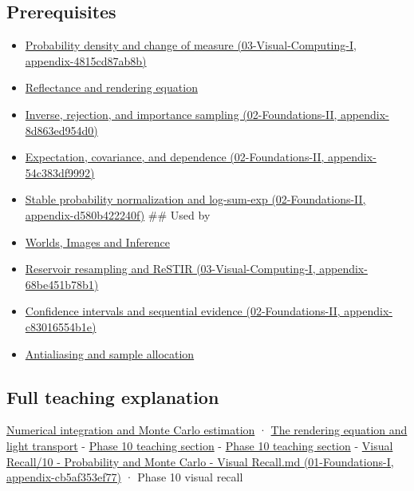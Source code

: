 \subsection{Prerequisites}\label{prerequisites}

\begin{itemize}
\item
  \href{}{Probability density and change of measure (03-Visual-Computing-I, appendix-4815cd87ab8b)}
\item
  \hyperref[appendix-96da0b153b77]{Reflectance and rendering equation}
\item
  \href{}{Inverse, rejection, and importance sampling (02-Foundations-II, appendix-8d863ed954d0)}
\item
  \href{}{Expectation, covariance, and dependence (02-Foundations-II, appendix-54c383df9992)}
\item
  \href{}{Stable probability normalization and log-sum-exp (02-Foundations-II, appendix-d580b422240f)} \#\# Used by
\item
  \href{Continuous\%20Notes/University\%20-\%20Worlds,\%20Images\%20and\%20Inference\%20-\%20Graphics,\%20Vision\%20and\%20Photography}{Worlds, Images and Inference}
\item
  \href{}{Reservoir resampling and ReSTIR (03-Visual-Computing-I, appendix-68be451b78b1)}
\item
  \href{}{Confidence intervals and sequential evidence (02-Foundations-II, appendix-c83016554b1e)}
\item
  \hyperref[appendix-4192b2bdd21e]{Antialiasing and sample allocation}
\end{itemize}

\subsection{Full teaching explanation}\label{full-teaching-explanation}

\href{Continuous\%20Notes/University\%20-\%20Worlds,\%20Images\%20and\%20Inference\%20-\%20Graphics,\%20Vision\%20and\%20Photography\#Numerical\%20integration\%20and\%20Monte\%20Carlo\%20estimation}{Numerical integration and Monte Carlo estimation} · \href{Continuous\%20Notes/University\%20-\%20Worlds,\%20Images\%20and\%20Inference\%20-\%20Graphics,\%20Vision\%20and\%20Photography\#The\%20rendering\%20equation\%20and\%20light\%20transport}{The rendering equation and light transport} - \href{Continuous\%20Notes/Computing\%20Foundations\%20-\%20From\%20Bits\%20to\%20C++\%20and\%20Systems\%20APIs\#8.\%20Monte\%20Carlo\%20estimates\%20trade\%20computation\%20for\%20uncertainty}{Phase 10 teaching section} - \href{Continuous\%20Notes/Computing\%20Foundations\%20-\%20From\%20Bits\%20to\%20C++\%20and\%20Systems\%20APIs\#7.\%20Transformations\%20turn\%20simple\%20inputs\%20into\%20useful\%20samples}{Phase 10 teaching section} - \href{}{Visual Recall/10 - Probability and Monte Carlo - Visual Recall.md (01-Foundations-I, appendix-cb5af353ef77)} · Phase 10 visual recall
